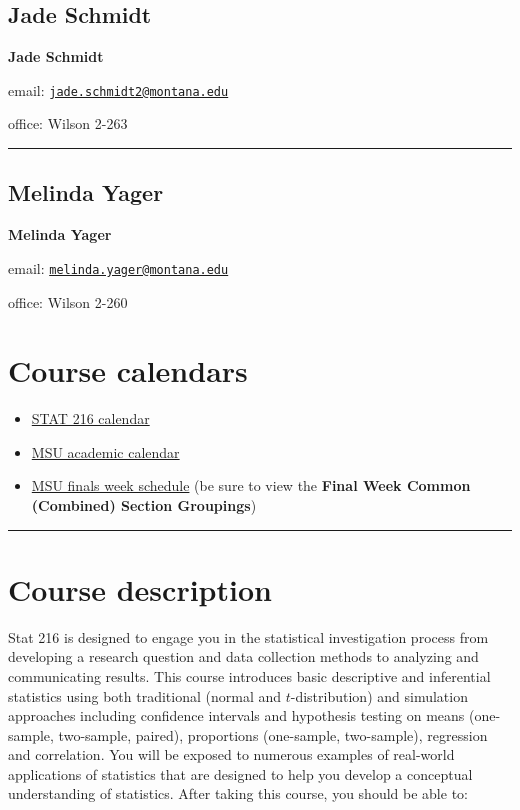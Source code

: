 \documentclass[
]{article}
\providecommand{\tightlist}{%
  \setlength{\itemsep}{0pt}\setlength{\parskip}{0pt}}
\begin{document}
\subsection{Jade Schmidt}\label{jade-schmidt}

\textbf{Jade Schmidt}

email:
\href{mailto:jade.schmidt2@montana.edu}{\nolinkurl{jade.schmidt2@montana.edu}}

office: Wilson 2-263

\begin{center}\rule{0.5\linewidth}{0.5pt}\end{center}

\subsection{Melinda Yager}\label{melinda-yager}

\textbf{Melinda Yager}

email:
\href{mailto:melinda.yager@montana.edu}{\nolinkurl{melinda.yager@montana.edu}}

office: Wilson 2-260

\section{Course calendars}\label{course-calendars}

\begin{itemize}
\tightlist
\item
  \href{calendars/F25-Stat216_Calendar.pdf}{STAT 216 calendar}
\item
  \href{http://catalog.montana.edu/academiccalendar/}{MSU academic
  calendar}
\item
  \href{https://www.montana.edu/registrar/Schedules.html}{MSU finals
  week schedule} (be sure to view the \textbf{Final Week Common
  (Combined) Section Groupings})
\end{itemize}

\begin{center}\rule{0.5\linewidth}{0.5pt}\end{center}

\section{Course description}\label{course-description}

Stat 216 is designed to engage you in the statistical investigation
process from developing a research question and data collection methods
to analyzing and communicating results. This course introduces basic
descriptive and inferential statistics using both traditional (normal
and \(t\)-distribution) and simulation approaches including confidence
intervals and hypothesis testing on means (one-sample, two-sample,
paired), proportions (one-sample, two-sample), regression and
correlation. You will be exposed to numerous examples of real-world
applications of statistics that are designed to help you develop a
conceptual understanding of statistics. After taking this course, you
should be able to:
\end{document}

